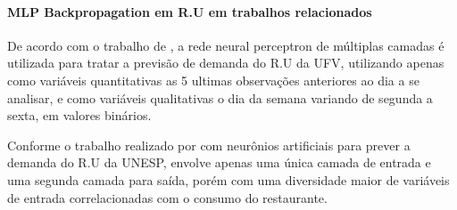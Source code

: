 \documentclass[	12pt, Times, openright, twoside, a4paper, english, brazil]{abntex2}
\begin{document}
  	       \paragraph*{MLP Backpropagation em R.U em trabalhos relacionados}
  	       De acordo com  o trabalho de \cite{Lopes2008}, a rede neural perceptron de múltiplas camadas é utilizada para tratar a previsão de demanda do R.U da UFV, utilizando apenas como variáveis quantitativas as 5 ultimas observações anteriores ao dia a se analisar, e como variáveis qualitativas o dia da semana variando de segunda a sexta, em valores binários.
  	       
           \begin{figure}[H]
           \end{figure}
            
           Conforme  o trabalho realizado por  \cite{Rocha2011} com neurônios artificiais para prever a demanda do R.U da UNESP, envolve apenas uma única camada de entrada e uma segunda camada para saída, porém com uma diversidade maior de variáveis de entrada correlacionadas com o consumo do restaurante. 
           \begin{figure}[H]
           \end{figure}
         
\end{document}
